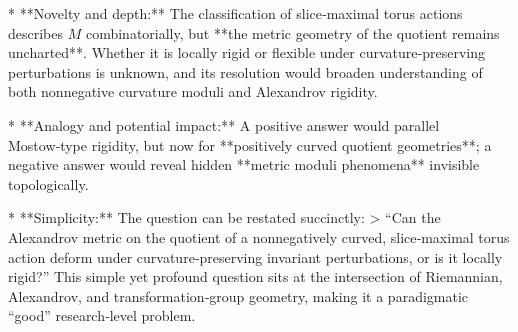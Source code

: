 * **Novelty and depth:** The classification of slice‑maximal torus actions describes \(M\) combinatorially, but **the metric geometry of the quotient remains uncharted**. Whether it is locally rigid or flexible under curvature‑preserving perturbations is unknown, and its resolution would broaden understanding of both nonnegative curvature moduli and Alexandrov rigidity.

* **Analogy and potential impact:** A positive answer would parallel Mostow‑type rigidity, but now for **positively curved quotient geometries**; a negative answer would reveal hidden **metric moduli phenomena** invisible topologically.

* **Simplicity:** The question can be restated succinctly:  
> “Can the Alexandrov metric on the quotient of a nonnegatively curved, slice‑maximal torus action deform under curvature‑preserving invariant perturbations, or is it locally rigid?”  
This simple yet profound question sits at the intersection of Riemannian, Alexandrov, and transformation‑group geometry, making it a paradigmatic “good” research‑level problem.